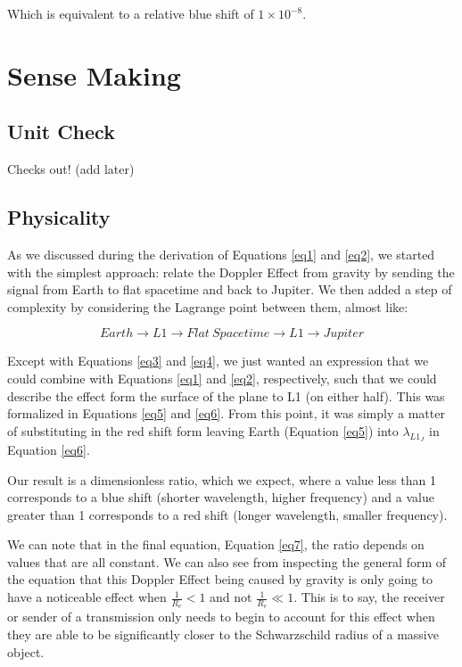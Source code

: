 \documentclass[]{report}
\begin{document}
      Which is equivalent to a relative blue shift of $1\times10^{-8}$.

  \chapter{Sense Making}
  \section{Unit Check}
    Checks out! (add later)

  \section{Physicality}
    As we discussed during the derivation of Equations \eqref{eq1} and \eqref{eq2}, we started with the simplest approach: relate the Doppler Effect from gravity by sending the signal from Earth to flat spacetime and back to Jupiter. We then added a step of complexity by considering the Lagrange point between them, almost like:

    $$Earth \rightarrow L1 \rightarrow Flat\ Spacetime \rightarrow L1 \rightarrow Jupiter$$

    Except with Equations \eqref{eq3} and \eqref{eq4}, we just wanted an expression that we could combine with Equations \eqref{eq1} and \eqref{eq2}, respectively, such that we could describe the effect form the surface of the plane to L1 (on either half). This was formalized in Equations \eqref{eq5} and \eqref{eq6}. From this point, it was simply a matter of substituting in the red shift form leaving Earth (Equation \ref{eq5}) into $\lambda_{L1_J}$ in Equation \eqref{eq6}.

    Our result is a dimensionless ratio, which we expect, where a value less than 1 corresponds to a blue shift (shorter wavelength, higher frequency) and a value greater than 1 corresponds to a red shift (longer wavelength, smaller frequency).

    We can note that in the final equation, Equation \eqref{eq7}, the ratio depends on values that are all constant. We can also see from inspecting the general form of the equation that this Doppler Effect being caused by gravity is only going to have a noticeable effect when $\frac{1}{R_e} < 1$ and not $\frac{1}{R_e} \ll 1$. This is to say, the receiver or sender of a transmission only needs to begin to account for this effect when they are able to be significantly closer to the Schwarzschild radius of a massive object.
\end{document}
